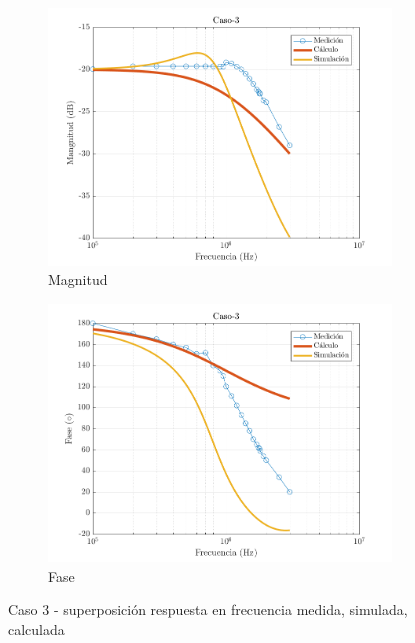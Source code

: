 \documentclass[../../main.tex]{subfiles}
\begin{document}
\begin{figure}[H]
\centering
\begin{subfigure}[http]{0.49\textwidth}
\includegraphics[width=\textwidth]{Caso-3_mag_inv}
\caption{Magnitud}\label{fig=magInvC3}
\end{subfigure}
\begin{subfigure}[http]{0.49\textwidth}
\includegraphics[width=\textwidth]{Caso-3_fase_inv}
\caption{Fase} \label{fig=fasInvC3}
\end{subfigure}
\caption{Caso 3 - superposición respuesta en  frecuencia medida, simulada, calculada}
\end{figure}
\end{document}
